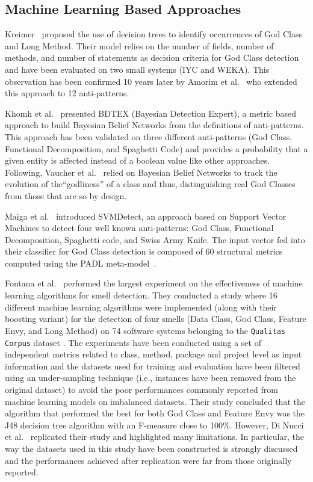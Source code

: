 \subsection{Machine Learning Based Approaches}
Kreimer~\cite{kreimer2005adaptive} proposed the use of decision trees to identify occurrences of God Class and Long Method. Their model relies on the number of fields, number of methods, and number of statements as decision criteria for God Class detection and have been evaluated on two small systems (IYC and WEKA). This observation has been confirmed 10 years later by Amorim et al.~\cite{amorim2015experience} who extended this approach to 12 anti-patterns.

Khomh et al.~\cite{khomh2009bayesian, khomh2011bdtex} presented BDTEX (Bayesian Detection Expert), a metric based approach to build Bayesian Belief Networks from the definitions of anti-patterns. This approach has been validated on three different anti-patterns (God Class, Functional Decomposition, and Spaghetti Code) and provides a probability that a given entity is affected instead of a boolean value like other approaches. Following, Vaucher et al.~\cite{vaucher2009tracking} relied on Bayesian Belief Networks to track the evolution of the``godliness'' of a class and thus, distinguishing real God Classes from those that are so by design.

Maiga et al.~\cite{maiga2012smurf,maiga2012support} introduced SVMDetect, an approach based on Support Vector Machines to detect four well known anti-patterns: God Class, Functional Decomposition, Spaghetti code, and Swiss Army Knife. The input vector fed into their classifier for God Class detection is composed of 60 structural metrics computed using the PADL meta-model~\cite{gueheneuc2005ptidej}.

Fontana et al.~\cite{fontana2016comparing} performed the largest experiment on the effectiveness of machine learning algorithms for smell detection. They conducted a study where 16 different machine learning algorithms were implemented (along with their boosting variant) for the detection of four smells (Data Class, God Class, Feature Envy, and Long Method) on 74 software systems belonging to the \texttt{Qualitas Corpus} dataset \cite{tempero2010qualitas}. The experiments have been conducted using a set of independent metrics related to class, method, package and project level as input information and the datasets used for training and evaluation have been filtered using an under-sampling technique (i.e., instances have been removed from the original dataset) to avoid the poor performances commonly reported from machine learning models on imbalanced datasets. Their study concluded that the algorithm that performed the best for both God Class and Feature Envy was the J48 decision tree algorithm with an F-measure close to 100\%. However, Di Nucci et al.~\cite{di2018detecting} replicated their study and highlighted many limitations. In particular, the way the datasets used in this study have been constructed is strongly discussed and the performances achieved after replication were far from those originally reported.

